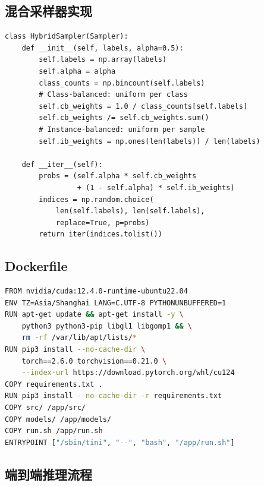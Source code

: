 \documentclass[12pt,a4paper]{article}
\begin{document}
\subsection{混合采样器实现}
\label{code:sampler}

\begin{lstlisting}[caption={混合采样器实现}]
class HybridSampler(Sampler):
    def __init__(self, labels, alpha=0.5):
        self.labels = np.array(labels)
        self.alpha = alpha
        class_counts = np.bincount(self.labels)
        # Class-balanced: uniform per class
        self.cb_weights = 1.0 / class_counts[self.labels]
        self.cb_weights /= self.cb_weights.sum()
        # Instance-balanced: uniform per sample
        self.ib_weights = np.ones(len(labels)) / len(labels)

    def __iter__(self):
        probs = (self.alpha * self.cb_weights
                 + (1 - self.alpha) * self.ib_weights)
        indices = np.random.choice(
            len(self.labels), len(self.labels),
            replace=True, p=probs)
        return iter(indices.tolist())
\end{lstlisting}

\subsection{Dockerfile}
\label{code:dockerfile}

\begin{lstlisting}[caption={Dockerfile},language=bash]
FROM nvidia/cuda:12.4.0-runtime-ubuntu22.04
ENV TZ=Asia/Shanghai LANG=C.UTF-8 PYTHONUNBUFFERED=1
RUN apt-get update && apt-get install -y \
    python3 python3-pip libgl1 libgomp1 && \
    rm -rf /var/lib/apt/lists/*
RUN pip3 install --no-cache-dir \
    torch==2.6.0 torchvision==0.21.0 \
    --index-url https://download.pytorch.org/whl/cu124
COPY requirements.txt .
RUN pip3 install --no-cache-dir -r requirements.txt
COPY src/ /app/src/
COPY models/ /app/models/
COPY run.sh /app/run.sh
ENTRYPOINT ["/sbin/tini", "--", "bash", "/app/run.sh"]
\end{lstlisting}

\subsection{端到端推理流程}
\label{code:inference}
\end{document}
